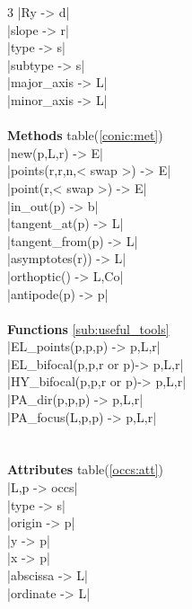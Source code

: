 \documentclass[DIV         = 14,
               fontsize    = 10,
               index       = totoc,
               twoside,
               cadre,
               headings    = small
               ]{tkz-doc}
\begin{document}
\begin{multicols}{3}
|Ry                        -> d|  \\
|slope                     -> r|  \\
|type                      -> s|  \\
|subtype                   -> s|  \\
|major_axis                -> L|  \\
|minor_axis                -> L|  \\
\\
\textbf{Methods} table(\ref{conic:met}) \\
|new(p,L,r)                -> E|   \\
|points(r,r,n,< swap >)    -> E|   \\
|point(r,< swap >)         -> E|   \\
|in_out(p)                 -> b|   \\
|tangent_at(p)             -> L|   \\
|tangent_from(p)           -> L|   \\
|asymptotes(r))            -> L|   \\
|orthoptic()            -> L,Co|   \\
|antipode(p)               -> p|    \\
                                   \\                        
\textbf{Functions}  \ref{sub:useful_tools}  \\
|EL_points(p,p,p)      -> p,L,r|   \\
|EL_bifocal(p,p,r or p)-> p,L,r|   \\
|HY_bifocal(p,p,r or p)-> p,L,r|   \\
|PA_dir(p,p,p)         -> p,L,r|   \\
|PA_focus(L,p,p)       -> p,L,r|   \\
                                   \\
               \\
\textbf{Attributes} table(\ref{occs:att}) \\
|L,p                    -> occs|   \\
|type                      -> s|   \\
|origin                    -> p|   \\
|y                         -> p|   \\
|x                         -> p|   \\
|abscissa                  -> L|   \\
|ordinate                  -> L|   \\

\end{multicols}
\end{document}
